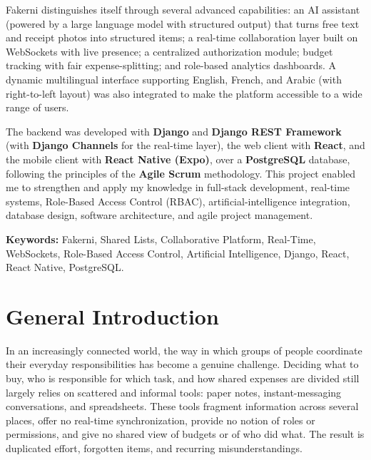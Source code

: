 \documentclass[12pt,a4paper,oneside]{report}
\begin{document}
\medskip
Fakerni distinguishes itself through several advanced capabilities: an AI
assistant (powered by a large language model with structured output) that turns
free text and receipt photos into structured items; a real-time collaboration
layer built on WebSockets with live presence; a centralized authorization module;
budget tracking with fair expense-splitting; and role-based analytics dashboards.
A dynamic multilingual interface supporting English, French, and Arabic (with
right-to-left layout) was also integrated to make the platform accessible to a
wide range of users.

\medskip
The backend was developed with \textbf{Django} and \textbf{Django REST Framework}
(with \textbf{Django Channels} for the real-time layer), the web client with
\textbf{React}, and the mobile client with \textbf{React Native (Expo)}, over a
\textbf{PostgreSQL} database, following the principles of the \textbf{Agile Scrum}
methodology. This project enabled me to strengthen and apply my knowledge in
full-stack development, real-time systems, Role-Based Access Control (RBAC),
artificial-intelligence integration, database design, software architecture, and
agile project management.

\medskip
\noindent\textbf{Keywords:} Fakerni, Shared Lists, Collaborative Platform,
Real-Time, WebSockets, Role-Based Access Control, Artificial Intelligence,
Django, React, React Native, PostgreSQL.

\tableofcontents
\listoffigures
\listoftables

\clearpage
{}

\chapter*{General Introduction}

In an increasingly connected world, the way in which groups of people coordinate
their everyday responsibilities has become a genuine challenge. Deciding what to
buy, who is responsible for which task, and how shared expenses are divided still
largely relies on scattered and informal tools: paper notes, instant-messaging
conversations, and spreadsheets. These tools fragment information across several
places, offer no real-time synchronization, provide no notion of roles or
permissions, and give no shared view of budgets or of who did what. The result is
duplicated effort, forgotten items, and recurring misunderstandings.
\end{document}
